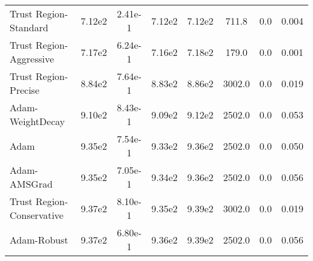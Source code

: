 \documentclass{article}
\begin{document}
\begin{table}[htbp]
{\begin{tabular}{p{2.5cm}*{7}{c}}
Trust Region-Standard & 7.12e2 & 2.41e-1 & 7.12e2 & 7.12e2 & 711.8 & 0.0 & 0.004 \\
Trust Region-Aggressive & 7.17e2 & 6.24e-1 & 7.16e2 & 7.18e2 & 179.0 & 0.0 & 0.001 \\
Trust Region-Precise & 8.84e2 & 7.64e-1 & 8.83e2 & 8.86e2 & 3002.0 & 0.0 & 0.019 \\
Adam-WeightDecay & 9.10e2 & 8.43e-1 & 9.09e2 & 9.12e2 & 2502.0 & 0.0 & 0.053 \\
Adam & 9.35e2 & 7.54e-1 & 9.33e2 & 9.36e2 & 2502.0 & 0.0 & 0.050 \\
Adam-AMSGrad & 9.35e2 & 7.05e-1 & 9.34e2 & 9.36e2 & 2502.0 & 0.0 & 0.056 \\
Trust Region-Conservative & 9.37e2 & 8.10e-1 & 9.35e2 & 9.39e2 & 3002.0 & 0.0 & 0.019 \\
Adam-Robust & 9.37e2 & 6.80e-1 & 9.36e2 & 9.39e2 & 2502.0 & 0.0 & 0.056 \\
\bottomrule
\end{tabular}
}
\end{table}
\end{document}
